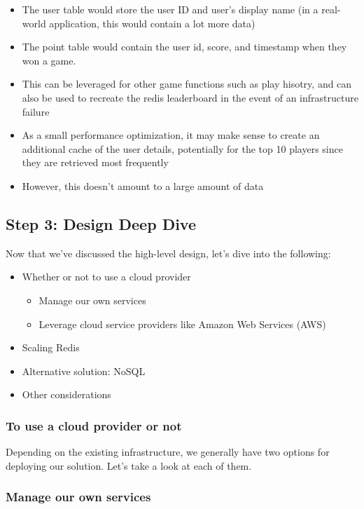\documentclass{report}
\theoremstyle{definition}
\let\oldsubsection\subsection
\let\oldsubsubsection\subsubsection
\renewcommand{\subsection}{\oldsubsection*}
\renewcommand{\subsubsection}{\oldsubsubsection*}
\begin{document}
\begin{itemize}
\item
The user table would store the user ID and user's display name (in a real-world application, this would contain a lot more data)
\item
The point table would contain the user id, score, and timestamp when they won a game.
\item
This can be leveraged for other game functions such as play hisotry, and can also be used to recreate the redis leaderboard in the event of an infrastructure failure
\item
As a small performance optimization, it may make sense to create an additional cache of the user details, potentially for the top 10 players since they are retrieved most frequently
\item
However, this doesn't amount to a large amount of data
\end{itemize}

\subsection{Step 3: Design Deep Dive}

Now that we've discussed the high-level design, let's dive into the following:


\begin{itemize}
\item
Whether or not to use a cloud provider

\begin{itemize}
\item
Manage our own services
\item
Leverage cloud service providers like Amazon Web Services (AWS)
\end{itemize}
\item
Scaling Redis
\item
Alternative solution: NoSQL
\item
Other considerations
\end{itemize}

\subsubsection{To use a cloud provider or not}

Depending on the existing infrastructure, we generally have two options for deploying our solution. Let's take a look at each of them.

\subsubsection{Manage our own services}
\end{document}
